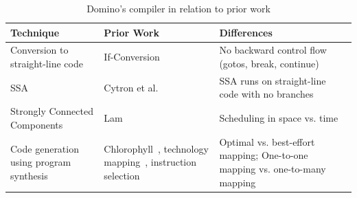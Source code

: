 \begin{table}[!t]
  \begin{scriptsize}
    \begin{tabular}{|p{}|p{}|p{}|}
  \hline
  Technique & Prior Work & Differences \\
  \hline
  Conversion to straight-line code & If-Conversion~\cite{if_conversion} & No backward control flow (gotos, break, continue) \\
  \hline
  SSA & Cytron et al.~\cite{ssa} & SSA runs on straight-line code with no branches \\
  \hline
  Strongly Connected Components & Lam~\cite{software_pipelining} & Scheduling in space vs. time \\
  \hline
  Code generation using program synthesis & Chlorophyll~\cite{chlorophyll}, technology mapping~\cite{micheli}, instruction selection~\cite{muchnik} & Optimal vs. best-effort mapping; One-to-one mapping vs. one-to-many mapping \\
  \hline
  \end{tabular}
  \end{scriptsize}
  \caption{Domino's compiler in relation to prior work}
  \label{tab:prior_compiler}
\end{table}

